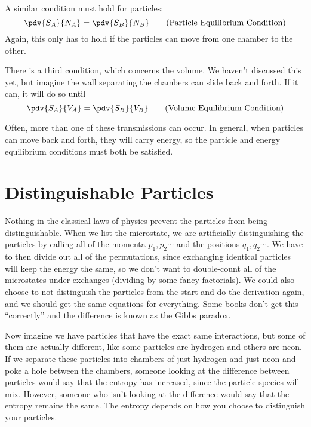 \documentclass[a4paper,twoside,master.tex]{subfiles}
\begin{document}
A similar condition must hold for particles:
\begin{equation}\label{eq:particle_equilibrium_condition}
    \pdv{S_A}{N_A} = \pdv{S_B}{N_B}\tag{Particle Equilibrium Condition}
\end{equation}
Again, this only has to hold if the particles can move from one chamber to the other.

There is a third condition, which concerns the volume. We haven't discussed this yet, but imagine the wall separating the chambers can slide back and forth. If it can, it will do so until
\begin{equation}\label{eq:volume_equilibrium_condition}
    \pdv{S_A}{V_A} = \pdv{S_B}{V_B}\tag{Volume Equilibrium Condition}
\end{equation}

Often, more than one of these transmissions can occur. In general, when particles can move back and forth, they will carry energy, so the particle and energy equilibrium conditions must both be satisfied.

\section{Distinguishable Particles}
\label{sec:distinguishable_particles}

Nothing in the classical laws of physics prevent the particles from being distinguishable. When we list the microstate, we are artificially distinguishing the particles by calling all of the momenta $ p_1, p_2 \cdots $ and the positions $ q_1, q_2 \cdots $. We have to then divide out all of the permutations, since exchanging identical particles will keep the energy the same, so we don't want to double-count all of the microstates under exchanges (dividing by some fancy factorials). We could also choose to not distinguish the particles from the start and do the derivation again, and we should get the same equations for everything. Some books don't get this ``correctly'' and the difference is known as the Gibbs paradox.

Now imagine we have particles that have the exact same interactions, but some of them are actually different, like some particles are hydrogen and others are neon. If we separate these particles into chambers of just hydrogen and just neon and poke a hole between the chambers, someone looking at the difference between particles would say that the entropy has increased, since the particle species will mix. However, someone who isn't looking at the difference would say that the entropy remains the same. The entropy depends on how you choose to distinguish your particles.
\end{document}
